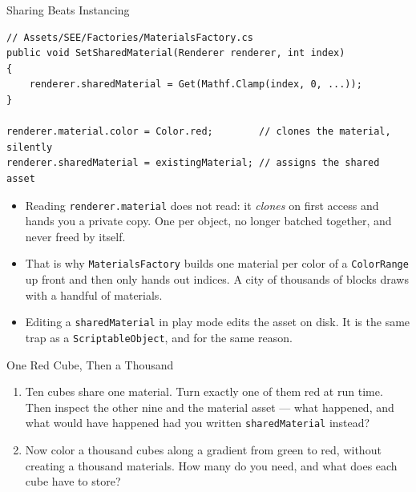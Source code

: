 \begin{frame}[fragile]{Sharing Beats Instancing}
  \begin{lstlisting}[basicstyle=\scriptsize\ttfamily]
// Assets/SEE/Factories/MaterialsFactory.cs
public void SetSharedMaterial(Renderer renderer, int index)
{
    renderer.sharedMaterial = Get(Mathf.Clamp(index, 0, ...));
}

renderer.material.color = Color.red;        // clones the material, silently
renderer.sharedMaterial = existingMaterial; // assigns the shared asset
  \end{lstlisting}
  \vspace{1ex}

  \begin{itemize}
    \item Reading \texttt{renderer.material} does not read: it \emph{clones}
      on first access and hands you a private copy. One per object, no longer
      batched together, and never freed by itself.
    \item That is why \texttt{MaterialsFactory} builds one material per color
      of a \texttt{ColorRange} up front and then only hands out indices. A
      city of thousands of blocks draws with a handful of materials.
    \item Editing a \texttt{sharedMaterial} in play mode edits the asset on
      disk. It is the same trap as a \texttt{ScriptableObject}, and for the
      same reason.
  \end{itemize}
\end{frame}

\begin{exerciseframe}{One Red Cube, Then a Thousand}
  \begin{enumerate}
    \item Ten cubes share one material. Turn exactly one of them red at run
      time. Then inspect the other nine and the material asset --- what
      happened, and what would have happened had you written
      \texttt{sharedMaterial} instead?
    \item Now color a thousand cubes along a gradient from green to red,
      without creating a thousand materials. How many do you need, and what
      does each cube have to store?
  \end{enumerate}
  \vspace{3ex}

\end{exerciseframe}

